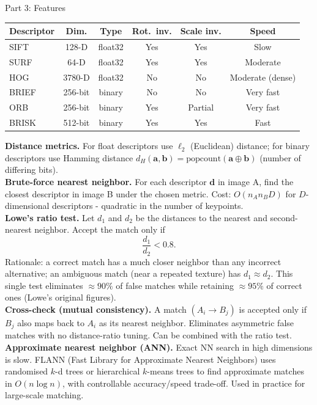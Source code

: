 \documentclass[letterpaper]{article}
\begin{document}
\begin{notes}{Part 3: Features}
\begin{center}
\begin{tabular}{@{}lccccc@{}}
\toprule
Descriptor & Dim. & Type & Rot.\ inv. & Scale inv. & Speed \\
\midrule
SIFT  & 128-D  & float32 & Yes & Yes & Slow \\
SURF  & 64-D   & float32 & Yes & Yes & Moderate \\
HOG   & 3780-D & float32 & No  & No  & Moderate (dense) \\
BRIEF & 256-bit & binary & No  & No  & Very fast \\
ORB   & 256-bit & binary & Yes & Partial & Very fast \\
BRISK & 512-bit & binary & Yes & Yes & Fast \\
\bottomrule
\end{tabular}
\end{center}


\textbf{Distance metrics.} For float descriptors use $\ell_2$ (Euclidean) distance; for binary descriptors use Hamming distance $d_H(\mathbf{a},\mathbf{b}) = \mathrm{popcount}(\mathbf{a} \oplus \mathbf{b})$ (number of differing bits).\\

\textbf{Brute-force nearest neighbor.} For each descriptor $\mathbf{d}$ in image A, find the closest descriptor in image B under the chosen metric. Cost: $O(n_A n_B D)$ for $D$-dimensional descriptors - quadratic in the number of keypoints.\\

\textbf{Lowe's ratio test.} Let $d_1$ and $d_2$ be the distances to the nearest and second-nearest neighbor. Accept the match only if
$$\frac{d_1}{d_2} < 0.8.$$
Rationale: a correct match has a much closer neighbor than any incorrect alternative; an ambiguous match (near a repeated texture) has $d_1 \approx d_2$. This single test eliminates $\approx90\%$ of false matches while retaining $\approx95\%$ of correct ones (Lowe's original figures).\\

\textbf{Cross-check (mutual consistency).} A match $(A_i \to B_j)$ is accepted only if $B_j$ also maps back to $A_i$ as its nearest neighbor. Eliminates asymmetric false matches with no distance-ratio tuning. Can be combined with the ratio test.\\

\textbf{Approximate nearest neighbor (ANN).} Exact NN search in high dimensions is slow. FLANN (Fast Library for Approximate Nearest Neighbors) uses randomised $k$-d trees or hierarchical $k$-means trees to find approximate matches in $O(n\log n)$, with controllable accuracy/speed trade-off. Used in practice for large-scale matching.\\


\end{notes}
\end{document}
